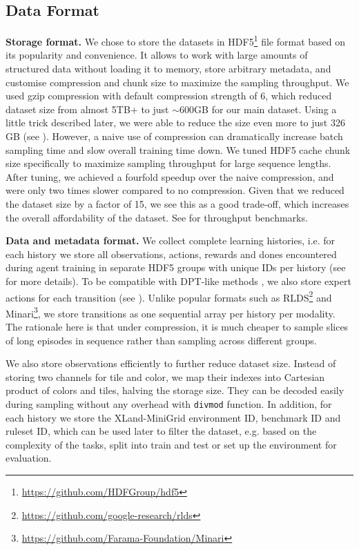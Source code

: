 \documentclass{article}
\begin{document}
\subsection{Data Format}

\textbf{Storage format.} We chose to store the datasets in HDF5\footnote{\url{https://github.com/HDFGroup/hdf5}} file format based on its popularity and convenience. It allows to work with large amounts of structured data without loading it to memory, store arbitrary metadata, and customise compression and chunk size to maximize the sampling throughput. We used gzip compression with default compression strength of 6, which reduced dataset size from almost 5TB+ to just $\sim$600GB for our main dataset. Using a little trick described later, we were able to reduce the size even more to just 326 GB (see ). However, a naive use of compression can dramatically increase batch sampling time and slow overall training time down. We tuned HDF5 cache chunk size specifically to maximize sampling throughput for large sequence lengths. After tuning, we achieved a fourfold speedup over the naive compression, and were only two times slower compared to no compression. Given that we reduced the dataset size by a factor of 15, we see this as a good trade-off, which increases the overall affordability of the dataset. See  for throughput benchmarks.

\textbf{Data and metadata format.} We collect complete learning histories, i.e. for each history we store all observations, actions, rewards and dones encountered during agent training in separate HDF5 groups with unique IDs per history (see  for more details). To be compatible with DPT-like methods \citep{lee2023supervised}, we also store expert actions for each transition (see ). Unlike popular formats such as RLDS\footnote{\url{https://github.com/google-research/rlds}} and Minari\footnote{\url{https://github.com/Farama-Foundation/Minari}}, we store transitions as one sequential array per history per modality. The rationale here is that under compression, it is much cheaper to sample slices of long episodes in sequence rather than sampling across different groups. 

We also store observations efficiently to further reduce dataset size. Instead of storing two channels for tile and color, we map their indexes into Cartesian product of colors and tiles, halving the storage size. They can be decoded easily during sampling without any overhead with \texttt{divmod} function. In addition, for each history we store the XLand-MiniGrid environment ID, benchmark ID and ruleset ID, which can be used later to filter the dataset, e.g. based on the complexity of the tasks, split into train and test or set up the environment for evaluation.
\end{document}
